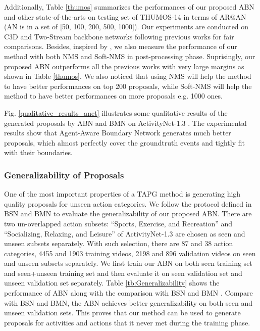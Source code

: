 \documentclass{ieeeaccess}
\begin{document}
Additionally, Table \ref{thumos} summarizes the performances of our proposed ABN and other state-of-the-arts on testing set of THUMOS-14 \cite{THUMOS14} in terms of AR@AN (AN is in a set of [50, 100, 200, 500, 1000]). Our experiments are conducted on C3D \cite{C3D_3} and Two-Stream \cite{2_stream_2} backbone networks following previous works for fair comparisons. Besides, inspired by \cite{dbg}, we also measure the performance of our method with both NMS and Soft-NMS in post-processing phase. Suprisingly, our proposed ABN outperforms all the previous works with very large margins as shown in Table \ref{thumos}. We also noticed that using NMS will help the method to have better performances on top 200 proposals, while Soft-NMS will help the method to have better performances on more proposals e.g. 1000 ones.

Fig. \ref{qualitative_results_anet} illustrates some qualitative results of the generated proposals by ABN and BMN \cite{bmn} on ActivityNet-1.3 \cite{caba2015activitynet}. The experimental results show that Agent-Aware Boundary Network generates much better proposals, which almost perfectly cover the groundtruth events and tightly fit with their boundaries.

\subsubsection{Generalizability of Proposals}
One of the most important properties of a TAPG method is generating high quality proposals for unseen action categories. We follow the protocol defined in BSN \cite{lin2018bsn} and BMN \cite{bmn} to evaluate the generalizability of our proposed ABN. There are two un-overlapped action subsets: “Sports, Exercise, and Recreation” and “Socializing, Relaxing, and Leisure” of ActivityNet-1.3 are chosen as seen and unseen subsets separately. With such selection, there are 87 and 38 action categories, 4455 and 1903 training videos, 2198 and 896 validation videos on seen and unseen subsets separately. We first train our ABN on both seen training set and seen+unseen training set and then evaluate it on seen validation set and unseen validation set separately. Table \ref{tb:Generalizability} shows the performance of ABN along with the comparison with BSN \cite{lin2018bsn} and BMN \cite{bmn}. Compare with BSN and BMN, the ABN achieves better generalizability on both seen and unseen validation sets. This proves that our method can be used to generate proposals for activities and actions that it never met during the training phase.
\end{document}
